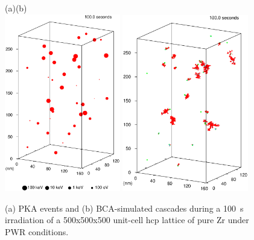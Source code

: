 \documentclass[a4paper]{article}
\begin{document}
\begin{figure}[t]
\hskip-0.5cm(a)\hskip7.2cm(b)\\
\includegraphics[width=0.45\textwidth]
{figures/pkas100s.eps}%
{\includegraphics[width=0.49\textwidth]
{figures/bca100s.eps}}
\caption{\label{bca}(a) PKA events and (b) BCA-simulated cascades during a 100~s irradiation of a 500x500x500 unit-cell hcp lattice of pure Zr under PWR conditions.}
\end{figure}
\end{document}
